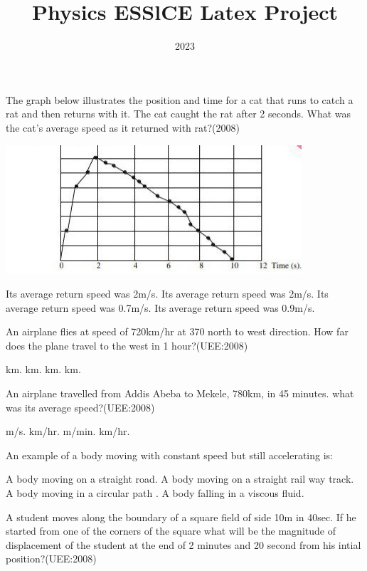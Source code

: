 \documentclass[12pt,addpoints]{exam}
\title{Physics ESSlCE Latex Project}
\date{2023}
\begin{document}
\maketitle
\begin{questions}
	\question The graph below illustrates the position and time for a cat that runs to catch a rat and then returns with it. The cat caught the rat after 2 seconds. What was the cat's average speed as it returned with rat?(2008)
	\begin{center}
		\includegraphics[scale=0.5]{fig1.jpg}
	\end{center}
	\begin{choices}
		\choice Its average return speed was 2m/s.
		\choice Its average return speed was 2m/s.
		\choice Its average return speed was 0.7m/s.
		\choice Its average return speed was 0.9m/s.
	\end{choices}
	\question An airplane flies at speed of 720km/hr at 370 north to west direction. How far does the plane travel to the west in 1 hour?(UEE:2008)\\
	\begin{oneparchoices}
		\choice 432 km.
		\choice 720 km.
		\choice 560 km.
		\choice 504 km.
	\end{oneparchoices}
	\question An airplane travelled from Addis Abeba to Mekele, 780km, in 45 minutes. what was its average speed?(UEE:2008)\\
	\begin{oneparchoices}
		 m/s.
		 km/hr.
		 m/min.
		 km/hr.
	\end{oneparchoices}
	\question An example of a body moving with constant speed but still accelerating is: 
	\begin{choices}
	\choice A body moving on a straight road.
	\choice A body moving on a straight rail way track.
	\choice A body moving in a circular path .
	\choice A body falling in a viscous fluid.
	\end{choices}
	\question A student moves along the boundary of a square field of side 10m in 40sec. If he started from one of the corners of the square what will be the magnitude of displacement of the student at the end of 2 minutes and 20 second from his intial position?(UEE:2008)\\

\end{questions}
\end{document}
